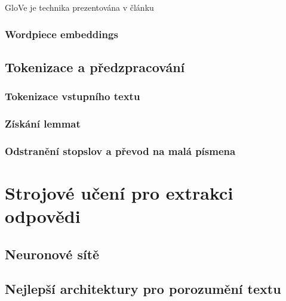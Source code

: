 GloVe je technika prezentována v článku \cite{GloVe}


\subsection{Wordpiece embeddings}
\blindtext[4]

\section{Tokenizace a předzpracování}
\blindtext[2]
\subsection{Tokenizace vstupního textu}
\blindtext[2]
\subsection{Získání lemmat}
\blindtext[1]
\subsection{Odstranění stopslov a převod na malá písmena}
\blindtext[1]




\chapter{Strojové učení pro extrakci odpovědi}
\label{language_comprehension}

\blindtext[2]

\section{Neuronové sítě}
\blindtext[6]

\section{Nejlepší architektury pro porozumění textu}
\blindtext[8]

